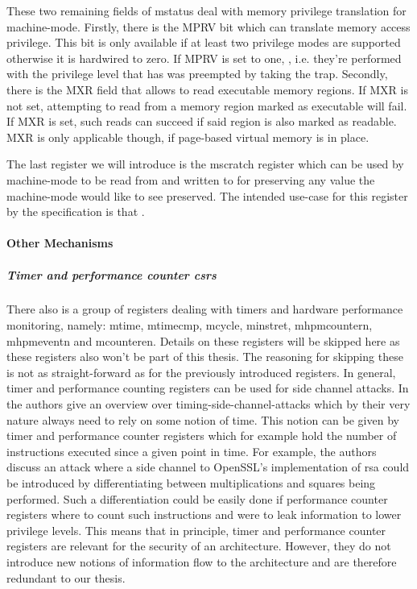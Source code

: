 These two remaining fields of \gls{mstatus} deal with memory privilege translation for machine-mode.
Firstly, there is the MPRV bit which can translate memory access privilege.
This bit is only available if at least two privilege modes are supported otherwise it is hardwired to zero.
If MPRV is set to one, , i.e. they're performed with the privilege level that has was preempted by taking the trap.
Secondly, there is the MXR field that allows to read executable memory regions.
If MXR is not set, attempting to read from a memory region marked as executable will fail.
If MXR is set, such reads can succeed if said region is also marked as readable.
MXR is only applicable though, if page-based virtual memory is in place.

The last register we will introduce is the \gls{mscratch} register which can be used by machine-mode to be read from and written to for preserving any value the machine-mode would like to see preserved.
The intended use-case for this register by the specification is that .


\paragraph{Other Mechanisms}
\label{sec:other-mechs}

\subparagraph{Timer and performance counter \glspl{csr}}
There also is a group of registers dealing with timers and hardware performance monitoring, namely: \gls{mtime}, \gls{mtimecmp}, \gls{mcycle}, \gls{minstret}, \gls{mhpmcountern}, \gls{mhpmeventn} and \gls{mcounteren}.
Details on these registers will be skipped here as these registers also won't be part of this thesis.
The reasoning for skipping these is not as straight-forward as for the previously introduced registers.
In general, timer and performance counting registers can be used for side channel attacks.
In \cite{Qian16} the authors give an overview over timing-side-channel-attacks which by their very nature always need to rely on some notion of time.
This notion can be given by timer and performance counter registers which for example hold the number of instructions executed since a given point in time.
For example, the authors discuss an attack where a side channel to OpenSSL's implementation of \gls{rsa} could be introduced by differentiating between multiplications and squares being performed.
Such a differentiation could be easily done if performance counter registers where to count such instructions and were to leak information to lower privilege levels.
This means that in principle, timer and performance counter registers are relevant for the security of an architecture.
However, they do not introduce new notions of information flow to the architecture and are therefore redundant to our thesis.

